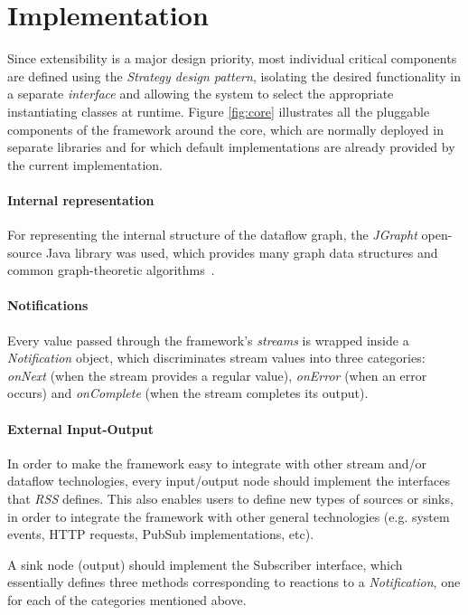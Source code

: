 \documentclass[sigplan,review,anonymous]{acmart}
\begin{document}
\section{Implementation} \label{sec:implementation}

Since extensibility is a major design priority, most individual critical
components are defined using the \textit{Strategy design pattern}, isolating the desired
functionality in a separate \textit{interface} and allowing the system to select the
appropriate instantiating classes at runtime. Figure \ref{fig:core} illustrates all the
pluggable components of the framework around the core, which are normally deployed in separate libraries
and for which default implementations are already provided by the current implementation.

\paragraph{Internal representation}
For representing the internal structure of the dataflow graph, the
\textit{JGrapht} open-source Java library was used, which provides many graph
data structures and common graph-theoretic algorithms~\cite{jgrapht}.

\paragraph{Notifications}
Every value passed through the framework's
\textit{streams} is wrapped inside a \textit{Notification} object, which
discriminates stream values into three categories: \textit{onNext} (when the
stream provides a regular value), \textit{onError} (when an error occurs) and
\textit{onComplete} (when the stream completes its output).

\paragraph{External Input-Output}
In order to make the framework easy to integrate with other stream and/or
dataflow technologies, every input/output node should implement the
interfaces that \textit{RSS} defines. This also enables users to define new
types of sources or sinks, in order to integrate the framework with other
general technologies (e.g. system events, HTTP requests, PubSub implementations,
etc).

A sink node (output) should implement the Subscriber interface, which
essentially defines three methods corresponding to reactions to a
\textit{Notification}, one for each of the categories mentioned above.
\end{document}
